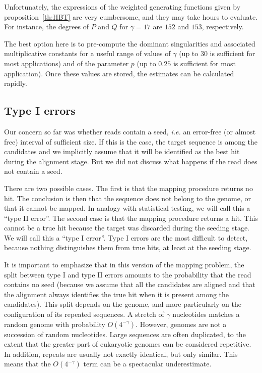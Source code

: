 \documentclass{article}
\begin{document}
Unfortunately, the expressions of the weighted generating functions given
by proposition~\ref{th:HBT} are very cumbersome, and they may take hours
to evaluate. For instance, the degrees of $P$ and $Q$ for $\gamma=17$ are
$152$ and $153$, respectively.

The best option here is to pre-compute the dominant singularities and
associated multiplicative constants for a useful range of values of
$\gamma$ (up to $30$ is sufficient for most applications) and of the
parameter $p$ (up to $0.25$ is sufficient for most application). Once
these values are stored, the estimates can be calculated rapidly.






\subsection{Type I errors}
\label{sec:fp}


Our concern so far was whether reads contain a seed, \textit{i.e.} an
error-free (or almost free) interval of sufficient size. If this is the
case, the target sequence is among the candidates and we implicitly assume
that it will be identified as the best hit during the alignment stage.
But we did not discuss what happens if the read does not contain a seed.

There are two possible cases. The first is that the mapping procedure
returns no hit. The conclusion is then that the sequence does not belong
to the genome, or that it cannot be mapped. In analogy with statistical
testing, we will call this a ``type II error''. The second case is that
the mapping procedure returns a hit. This cannot be a true hit because the
target was discarded during the seeding stage. We will call this a ``type
I error''. Type I errors are the most difficult to detect, because nothing
distinguishes them from true hits, at least at the seeding stage.

It is important to emphasize that in this version of the mapping problem,
the split between type I and type II errors amounts to the probability
that the read contains no seed (because we assume that all the candidates
are aligned and that the alignment always identifies the true hit when it
is present among the candidates). This split depends on the genome, and
more particularly on the configuration of its repeated sequences. A
stretch of  $\gamma$ nucleotides matches a random genome with probability
$O(4^{-\gamma})$. However, genomes are not a succession of random
nucleotides. Large sequences are often duplicated, to the extent that the
greater part of eukaryotic genomes can be considered repetitive. In
addition, repeats are usually not exactly identical, but only similar.
This means that the $O(4^{-\gamma})$ term can be a spectacular
underestimate.
\end{document}
